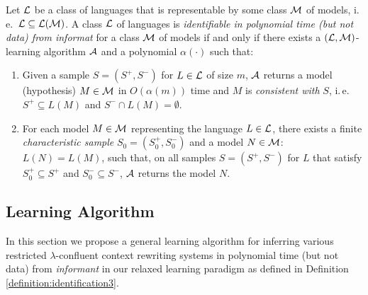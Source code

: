 \begin{definition}\label{definition:identification3}
Let $\textup{\sf $\mathcal{L}$}$ be a class of languages that is representable by some class $\textup{\sf $\mathcal{M}$}$ of models, i.\,e.\  $\textup{\sf $\mathcal{L}$} \subseteq {\cal L}(\textup{\sf $\mathcal{M}$})$. A class $\textup{\sf $\mathcal{L}$}$ of languages is \emph{identifiable in polynomial time (but not data) from informat} for a class $\textup{\sf $\mathcal{M}$}$ of models if and only if there exists a $(\textup{\sf $\mathcal{L}$}, \textup{\sf $\mathcal{M}$})$-learning algorithm $\textup{\sf $\mathcal{A}$}$ and a polynomial $\alpha(\cdot)$ such that:
\begin{enumerate}
\item\label{relaxed-polynomial1} Given a sample $S = (S^+, S^-)$ for $L \in \textup{\sf $\mathcal{L}$}$ of size $m$, $\textup{\sf $\mathcal{A}$}$ returns a model (hypothesis) $M \in \textup{\sf $\mathcal{M}$}$ in $O(\alpha(m))$ time and $M$ is \emph{consistent with} $S$, i.\,e.\ $S^+ \subseteq L(M)$ and $S^- \cap L(M) = \emptyset$.

\item\label{relaxed-polynomial2} For each model $M \in \textup{\sf $\mathcal{M}$}$ representing the language $L \in \textup{\sf $\mathcal{L}$}$, there exists a finite \emph{characteristic sample} $S_0 = (S_0^+, S_0^-)$ and a model $N \in \textup{\sf $\mathcal{M}$}$: $L(N) = L(M)$, such that, on all samples $S = (S^+, S^-)$ for $L$ that satisfy $S_0^+ \subseteq S^+$ and $S_0^- \subseteq S^-$, $\textup{\sf $\mathcal{A}$}$ returns the model $N$.
\end{enumerate}
\end{definition}

\subsection{Learning Algorithm}\label{section:algorithm}

In this section we propose a general learning algorithm for inferring various restricted $\lambda$-confluent context rewriting systems in polynomial time (but not data) from \emph{informant} in our relaxed learning paradigm as defined in Definition \ref{definition:identification3}.


